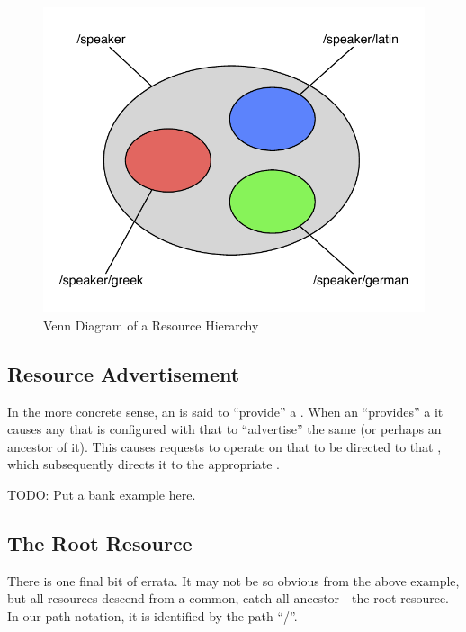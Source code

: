 \begin{figure}
        \begin{center}\includegraphics[width=\myfigwidth,height=\myfigheight,keepaspectratio]{figs/omnigraffle/res_example1}\end{center}
        \caption{Venn Diagram of a Resource Hierarchy}\label{fig:res-example1}
\end{figure}

\subsection{Resource Advertisement}


In the more concrete sense, an \actor{} is said to ``provide'' a \resource{}.  When an \actor{} ``provides'' a \resource{} it causes any \agent{} that is configured with that \actor{} to ``advertise'' the same \resource{} (or perhaps an ancestor of it).  This causes requests to operate on that \resource{} to be directed to that \agent{}, which subsequently directs it to the appropriate \actor{}.

TODO: Put a bank example here.

\subsection{The Root Resource}

There is one final bit of errata.  It may not be so obvious from the above example, but all resources descend from a common, catch-all ancestor---the {\sf root} resource.  In our path notation, it is identified by the path ``{\sf /}''.

